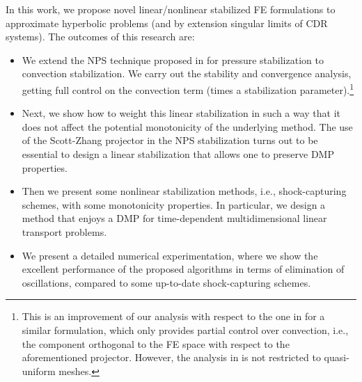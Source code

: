 In this work, we propose novel linear/nonlinear stabilized FE formulations to approximate hyperbolic problems (and by extension singular limits of CDR systems). The outcomes of this research are:
\begin{itemize}
\item  We extend the NPS technique proposed in \cite{badia_stabilized_2012} for pressure stabilization to convection stabilization. We carry out the stability and convergence analysis, getting full control on the convection term (times a stabilization parameter).\footnote{This is an improvement of our analysis with respect to the one in \cite{rebollo_high_2013} for a similar formulation, which only provides partial control over convection, i.e., the component orthogonal to the FE space with respect to the aforementioned projector. However, the analysis in \cite{rebollo_high_2013} is not restricted to quasi-uniform meshes.}
\item Next, we show how to weight this linear stabilization in such a way that it  does not affect the potential  monotonicity of the underlying method. The use of the Scott-Zhang projector in the NPS stabilization turns out to be essential to design a linear stabilization that allows one to preserve DMP properties. 
\item Then we present some nonlinear stabilization methods, i.e., shock-capturing schemes, with some  monotonicity properties. In particular, we design a method that enjoys a DMP for time-dependent multidimensional linear transport problems. 
\item   We present a detailed numerical experimentation, where we show the excellent performance of the proposed algorithms in terms of elimination of oscillations, compared to some up-to-date shock-capturing schemes. 
\end{itemize}


